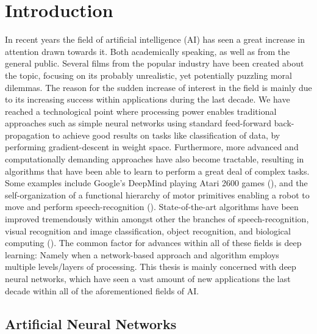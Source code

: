 
\chapter{Introduction}

In recent years the field of artificial intelligence (AI) has seen a great increase in attention drawn towards it. Both academically speaking, as well as from the general public. Several films from the popular industry have been created about the topic, focusing on its probably unrealistic, yet potentially puzzling moral dilemmas. The reason for the sudden increase of interest in the field is mainly due to its increasing success within applications during the last decade. We have reached a technological point where processing power enables traditional approaches such as simple neural networks using standard feed-forward back-propagation to achieve good results on tasks like classification of data, by performing gradient-descent in weight space. Furthermore, more advanced and computationally demanding approaches have also become tractable, resulting in algorithms that have been able to learn to perform a great deal of complex tasks. Some examples include Google's DeepMind playing Atari 2600 games (\cite{Mnih2015}), and the self-organization of a functional hierarchy of motor primitives enabling a robot to move and perform speech-recognition (\cite{Tani2014}). State-of-the-art algorithms have been improved tremendously within amongst other the branches of speech-recognition, visual recognition and image classification, object recognition, and biological computing (\cite{LeCun2015}). The common factor for advances within all of these fields is deep learning: Namely when a network-based approach and algorithm employs multiple levels/layers of processing. This thesis is mainly concerned with deep neural networks, which have seen a vast amount of new applications the last decade within all of the aforementioned fields of AI.

\section{Artificial Neural Networks}

